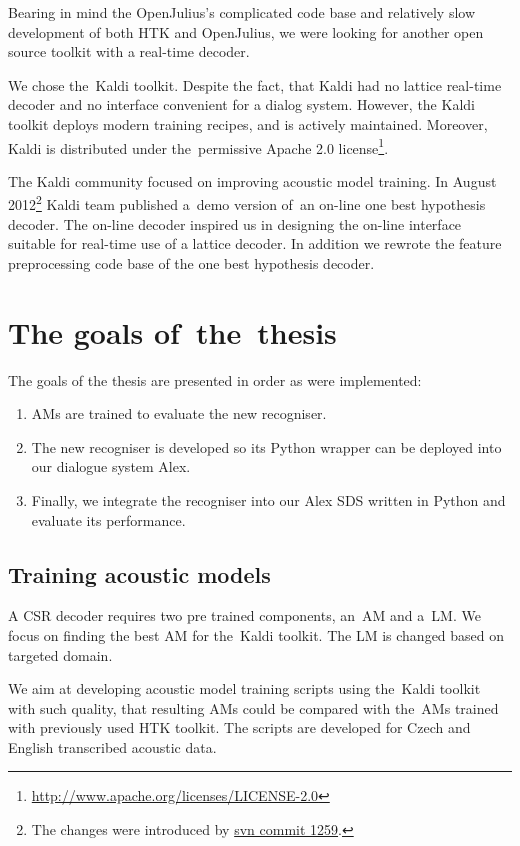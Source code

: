 Bearing in mind the OpenJulius's complicated code base and relatively slow development of both \ac{HTK} and OpenJulius, we were looking for another open source toolkit with a real-time decoder.

We chose the~Kaldi toolkit. 
Despite the fact,  that Kaldi had no lattice real-time decoder and no interface convenient for a dialog system.
However, the Kaldi toolkit deploys modern training recipes, and is actively maintained. 
Moreover, Kaldi is distributed under the~permissive Apache 2.0 license\footnote{\url{http://www.apache.org/licenses/LICENSE-2.0}}.

The Kaldi community focused on improving acoustic model training. 
In August 2012\footnote{The changes were introduced by \href{https://sourceforge.net/p/kaldi/code/1259/}{svn commit 1259}.} Kaldi team published a~demo version of~an on-line one best hypothesis decoder.
The on-line decoder inspired us in designing the on-line interface suitable for real-time use of a lattice decoder.
In addition we rewrote the feature preprocessing code base of the one best hypothesis decoder.

\section{The goals of~the~thesis} 
\label{sec:goals}
The goals of the thesis are presented in order as were implemented:
\begin{enumerate}
    \item \acp{AM} are trained to evaluate the new recogniser.
    \item The new recogniser is developed so its Python wrapper can be deployed into our dialogue system Alex.
    \item Finally, we integrate the recogniser into our Alex \ac{SDS} written in Python and evaluate its performance.
\end{enumerate}

\subsection{Training acoustic models} 
\label{sub:training_kaldi_acoustic_models}
A \acl{CSR} decoder requires two pre trained components, an~\acl{AM} and a~\acl{LM}. 
We focus on finding the best \acl{AM} for the~Kaldi toolkit. 
The \acl{LM} is changed based on targeted domain.

We aim at developing acoustic model training scripts using the~Kaldi toolkit with such quality, that resulting \acp{AM} could be compared with the~\acp{AM} trained with previously used \ac{HTK} toolkit. 
The scripts are developed for Czech and English transcribed acoustic data.



